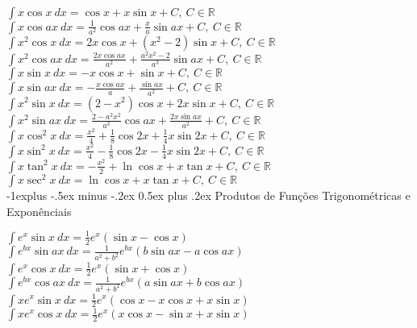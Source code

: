 \documentclass[10pt,landscape]{article}
\makeatletter
\renewcommand{\subsection}{\@startsection{subsection}{2}{0mm}%
                                {-1explus -.5ex minus -.2ex}%
                                {0.5ex plus .2ex}%
                                {\normalfont\normalsize\bfseries}}
\makeatother
\begin{document}
\begin{multicols}{3}
$\int x \cos x \ dx = \cos x + x \sin x + C,\ C \in \mathbb{R}$\\
$\int x \cos ax \ dx = \frac{1}{a^2} \cos ax + \frac{x}{a} \sin ax + C,\ C \in \mathbb{R}$\\
$\int x^2 \cos x \ dx = 2 x \cos x + ( x^2 - 2) \sin x + C,\ C \in \mathbb{R}$\\
$\int x^2 \cos ax \ dx = \frac{2 x \cos ax }{a^2} + \frac{ a^2 x^2 - 2  }{a^3} \sin ax + C,\ C \in \mathbb{R}$\\
$\int x \sin x\ dx = -x \cos x + \sin x + C,\ C \in \mathbb{R}$\\
$\int x \sin ax\ dx = -\frac{x \cos ax}{a} + \frac{\sin ax}{a^2} + C,\ C \in \mathbb{R}$\\
$\int x^2 \sin x\ dx = (2-x^2) \cos x + 2 x \sin x + C,\ C \in \mathbb{R}$\\
$\int x^2 \sin ax\ dx =\frac{2-a^2x^2}{a^3}\cos ax +\frac{ 2 x \sin ax}{a^2} + C,\ C \in \mathbb{R}$\\
$\int x \cos^2 x \ dx = \frac{x^2}{4}+\frac{1}{8}\cos 2x + \frac{1}{4} x \sin 2x + C,\ C \in \mathbb{R}$\\
$\int x \sin^2 x \ dx = \frac{x^2}{4}-\frac{1}{8}\cos 2x - \frac{1}{4} x \sin 2x + C,\ C \in \mathbb{R}$\\
$\int x \tan^2 x \ dx = -\frac{x^2}{2} + \ln \cos x + x \tan x + C,\ C \in \mathbb{R}$\\
$\int x \sec^2 x \ dx = \ln \cos x + x \tan x + C,\ C \in \mathbb{R}$\\

\subsection{Produtos de Funções Trigonométricas e Exponênciais}

$\int e^x \sin x \ dx = \frac{1}{2}e^x (\sin x - \cos x)$\\
$\int e^{bx} \sin ax\ dx = \frac{1}{a^2+b^2}e^{bx} (b\sin ax - a\cos ax)$\\
$\int e^x \cos x\ dx = \frac{1}{2}e^x (\sin x + \cos x)$\\
$\int e^{bx} \cos ax\ dx = \frac{1}{a^2 + b^2} e^{bx} ( a \sin ax + b \cos ax )$\\
$\int x e^x \sin x\ dx = \frac{1}{2}e^x (\cos x - x \cos x + x \sin x)$\\
$\int x e^x \cos x\ dx = \frac{1}{2}e^x (x \cos x - \sin x + x \sin x)$\\




\end{multicols}
\end{document}
